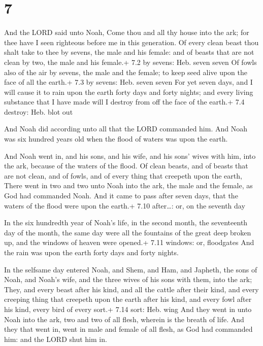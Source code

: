 \hypertarget{section-6}{%
\section{7}\label{section-6}}

 And the LORD said unto Noah, Come thou and all thy house
into the ark; for thee have I seen righteous before me in this
generation.  Of every clean beast thou shalt take to thee by
sevens, the male and his female: and of beasts that are not clean by
two, the male and his female.+ 7.2 by sevens: Heb. seven seven
 Of fowls also of the air by sevens, the male and the
female; to keep seed alive upon the face of all the earth.+ 7.3 by
sevens: Heb. seven seven  For yet seven days, and I will
cause it to rain upon the earth forty days and forty nights; and every
living substance that I have made will I destroy from off the face of
the earth.+ 7.4 destroy: Heb. blot out

 And Noah did according unto all that the LORD commanded
him.  And Noah was six hundred years old when the flood of
waters was upon the earth.

 And Noah went in, and his sons, and his wife, and his
sons' wives with him, into the ark, because of the waters of the flood.
 Of clean beasts, and of beasts that are not clean, and of
fowls, and of every thing that creepeth upon the earth, 
There went in two and two unto Noah into the ark, the male and the
female, as God had commanded Noah.  And it came to pass
after seven days, that the waters of the flood were upon the earth.+
7.10 after\ldots: or, on the seventh day

 In the six hundredth year of Noah's life, in the second
month, the seventeenth day of the month, the same day were all the
fountains of the great deep broken up, and the windows of heaven were
opened.+ 7.11 windows: or, floodgates  And the rain was
upon the earth forty days and forty nights.

 In the selfsame day entered Noah, and Shem, and Ham, and
Japheth, the sons of Noah, and Noah's wife, and the three wives of his
sons with them, into the ark;  They, and every beast after
his kind, and all the cattle after their kind, and every creeping thing
that creepeth upon the earth after his kind, and every fowl after his
kind, every bird of every sort.+ 7.14 sort: Heb. wing  And
they went in unto Noah into the ark, two and two of all flesh, wherein
is the breath of life.  And they that went in, went in male
and female of all flesh, as God had commanded him: and the LORD shut him
in.

